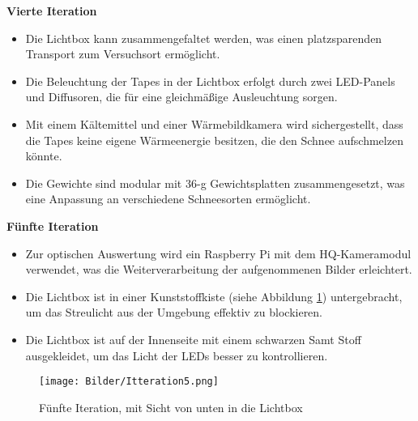 \textbf{Vierte Iteration}

\begin{itemize}
    \item Die Lichtbox kann zusammengefaltet werden, was einen platzsparenden Transport zum Versuchsort ermöglicht.
    \item Die Beleuchtung der Tapes in der Lichtbox erfolgt durch zwei LED-Panels und Diffusoren, die für eine gleichmäßige Ausleuchtung sorgen.
    \item Mit einem Kältemittel und einer Wärmebildkamera wird sichergestellt, dass die Tapes keine eigene Wärmeenergie besitzen, die den Schnee aufschmelzen könnte.
    \item Die Gewichte sind modular mit 36-g Gewichtsplatten zusammengesetzt, was eine Anpassung an verschiedene Schneesorten ermöglicht.
\end{itemize}

\textbf{Fünfte Iteration}
\label{sec:funfItt}
\begin{itemize}
    \item Zur optischen Auswertung wird ein Raspberry Pi mit dem HQ-Kameramodul verwendet, was die Weiterverarbeitung der aufgenommenen Bilder erleichtert.
    \item Die Lichtbox ist in einer Kunststoffkiste (siehe Abbildung \ref{fig:funfItter}) untergebracht, um das Streulicht aus der Umgebung effektiv zu blockieren.
      \item Die Lichtbox ist auf der Innenseite mit einem schwarzen Samt Stoff ausgekleidet, um das Licht der LEDs besser zu kontrollieren.
\end{itemize}


\begin{figure}
    \centering
    \texttt{[image: Bilder/Itteration5.png]}
    \caption{Fünfte Iteration, mit Sicht von unten in die Lichtbox}
    \label{fig:funfItter}
\end{figure}
